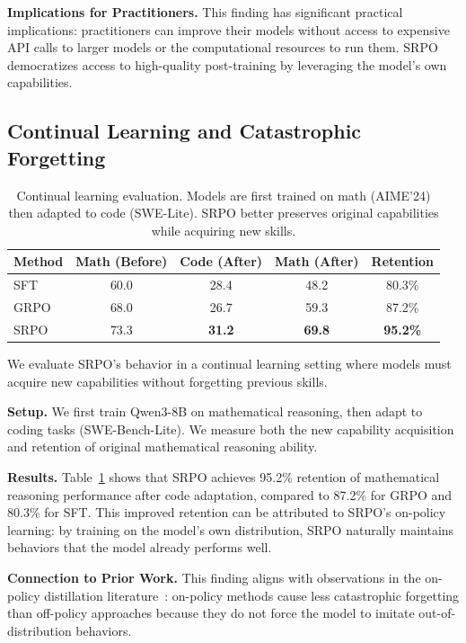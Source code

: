 \documentclass{article}
\newcommand{\method}{SRPO}
\theoremstyle{plain}
\theoremstyle{definition}
\theoremstyle{remark}
\begin{document}
\textbf{Implications for Practitioners.}
This finding has significant practical implications: practitioners can improve their models without access to expensive API calls to larger models or the computational resources to run them.
\method{} democratizes access to high-quality post-training by leveraging the model's own capabilities.


\subsection{Continual Learning and Catastrophic Forgetting}
\label{sec:continual}

\begin{table}[t]
\centering
\caption{Continual learning evaluation. Models are first trained on math (AIME'24) then adapted to code (SWE-Lite). \method{} better preserves original capabilities while acquiring new skills.}
\label{tab:continual}
\vspace{0.5em}
\small
\begin{tabular}{@{}lcccc@{}}
\toprule
\textbf{Method} & \textbf{Math (Before)} & \textbf{Code (After)} & \textbf{Math (After)} & \textbf{Retention} \\
\midrule
SFT & 60.0 & 28.4 & 48.2 & 80.3\% \\
GRPO & 68.0 & 26.7 & 59.3 & 87.2\% \\
\method{} & 73.3 & \textbf{31.2} & \textbf{69.8} & \textbf{95.2\%} \\
\bottomrule
\end{tabular}
\end{table}

We evaluate \method{}'s behavior in a continual learning setting where models must acquire new capabilities without forgetting previous skills.

\textbf{Setup.}
We first train Qwen3-8B on mathematical reasoning, then adapt to coding tasks (SWE-Bench-Lite).
We measure both the new capability acquisition and retention of original mathematical reasoning ability.

\textbf{Results.}
Table~\ref{tab:continual} shows that \method{} achieves 95.2\% retention of mathematical reasoning performance after code adaptation, compared to 87.2\% for GRPO and 80.3\% for SFT.
This improved retention can be attributed to \method{}'s on-policy learning: by training on the model's own distribution, \method{} naturally maintains behaviors that the model already performs well.

\textbf{Connection to Prior Work.}
This finding aligns with observations in the on-policy distillation literature~\cite{lu2025onpolicydistillation}: on-policy methods cause less catastrophic forgetting than off-policy approaches because they do not force the model to imitate out-of-distribution behaviors.
\end{document}
